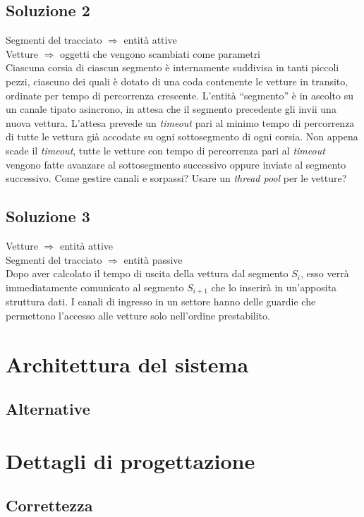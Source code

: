\documentclass[11pt,a4paper]{report}
\begin{document}
\section*{Soluzione 2}
Segmenti del tracciato $\Rightarrow$ entità attive \\
Vetture $\Rightarrow$ oggetti che vengono scambiati come parametri \\

Ciascuna corsia di ciascun segmento è internamente suddivisa in tanti piccoli pezzi, ciascuno dei quali è dotato di una coda contenente le vetture in transito, ordinate per tempo di percorrenza crescente. L'entità ``segmento'' è in ascolto su un canale tipato asincrono, in attesa che il segmento precedente gli invii una nuova vettura. L'attesa prevede un \textit{timeout} pari al minimo tempo di percorrenza di tutte le vettura già accodate su ogni sottosegmento di ogni corsia. Non appena scade il \textit{timeout}, tutte le vetture con tempo di percorrenza pari al \textit{timeout} vengono fatte avanzare al sottosegmento successivo oppure inviate al segmento successivo. Come gestire canali e sorpassi? Usare un \textit{thread pool} per le vetture?

\section*{Soluzione 3}
Vetture $\Rightarrow$ entità attive \\
Segmenti del tracciato $\Rightarrow$ entità passive \\

Dopo aver calcolato il tempo di uscita della vettura dal segmento $S_i$, esso verrà immediatamente comunicato al segmento $S_{i+1}$ che lo inserirà in un'apposita struttura dati. I canali di ingresso in un settore hanno delle guardie che permettono l'accesso alle vetture solo nell'ordine prestabilito.

\chapter{Architettura del sistema}
\section{Alternative}

\chapter{Dettagli di progettazione}
\section{Correttezza}
\end{document}
